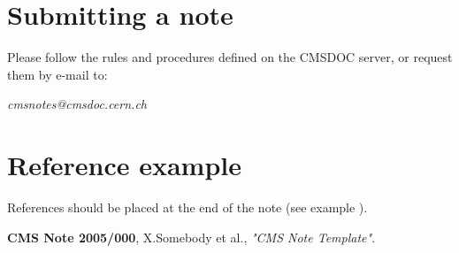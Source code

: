 \documentclass{cmspaper}
\begin{document}

\section{Submitting a note}

Please follow the rules and procedures defined on the CMSDOC server, or request them by e-mail to:\begin{center} {\em cmsnotes@cmsdoc.cern.ch} \end{center}

\section{Reference example}

References should be placed at the end of the note 
(see example \cite{NOTE000}).

\begin{thebibliography}{9}
   {\bf CMS Note 2005/000},
    X.Somebody et al.,
    {\em "CMS Note Template"}.
\end{thebibliography}
 
\pagebreak
\end{document}
